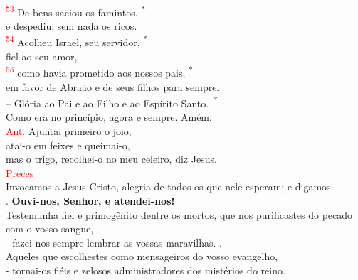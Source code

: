 \documentclass{book}
\begin{document}
\begin{center}
    \vspace{.2cm} \\
    \textsuperscript{\underline{\hspace{.07in}}\textcolor{red}{53}} De bens saciou os famintos, \textsuperscript{*}\\
    e despediu, sem nada os ricos. \\
    \textsuperscript{\underline{\hspace{.07in}}\textcolor{red}{54}} Acolheu Israel, seu servidor, \textsuperscript{*} \\
    fiel ao seu amor,
    \vspace{.2cm} \\
    \textsuperscript{\underline{\hspace{.07in}}\textcolor{red}{55}} como havia prometido aos nossos pais, \textsuperscript{*} \\
    em favor de Abraão e de seus filhos para sempre.
    \vspace{.2cm} \\
    -- Glória ao Pai e ao Filho e ao Espírito Santo.\ \textsuperscript{*} \\
    Como era no princípio, agora e sempre. Amém.
    \vspace{.2cm} \\
    \textcolor{red}{Ant.} Ajuntai primeiro o joio, \\
    atai-o em feixes e queimai-o, \\
    mas o trigo, recolhei-o no meu celeiro, diz Jesus.
    \vspace{.2cm} \\
    \textcolor{red}{Preces}
    \vspace{.2cm} \\
    Invocamos a Jesus Cristo, alegria de todos os que nele esperam; e digamos:
    \vspace{.2cm} \\
    {\color{red} \Rbar.} \textbf{Ouvi-nos, Senhor, e atendei-nos!}
    \vspace{.2cm} \\
    Testemunha fiel e primogênito dentre os mortos, que nos purificastes do pecado com o vosso sangue, \\
    - fazei-nos sempre lembrar as vossas maravilhas.  {\color{red} \Rbar.}
    \vspace{.2cm} \\
    Aqueles que escolhestes como mensageiros do vosso evangelho, \\
    - tornai-os fiéis e zelosos administradores dos mistérios do reino. {\color{red} \Rbar.}

\end{center}
\end{document}
